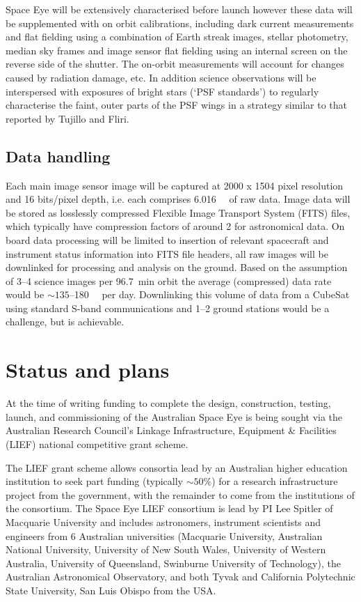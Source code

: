 \documentclass[]{iac}
\begin{document}
Space Eye will be extensively characterised before launch however these data will be supplemented with on orbit
calibrations, including dark current measurements and flat fielding using a combination of Earth streak images, stellar
photometry, median sky frames and image sensor flat fielding using an internal screen on the reverse side of the
shutter. The on-orbit measurements will account for changes caused by radiation damage, etc.
In addition science observations will be interspersed with exposures of bright stars (`PSF standards') to regularly
characterise the faint, outer parts of the PSF wings in a strategy similar to that reported by Tujillo and
Fliri\cite{Trujillo2015}.

\subsection{Data handling}

Each main image sensor image will be captured at 2000 x 1504 pixel resolution and 16 bits/pixel depth, i.e. each
comprises \SI{6.016}{\mega\byte} of raw data. Image data will be stored as losslessly compressed Flexible Image
Transport System (FITS) files, which typically have compression factors of around 2 for astronomical data. On board data
processing will be limited to insertion of relevant spacecraft and instrument status information into FITS file headers,
all raw images will be downlinked for processing and analysis on the ground. Based on the assumption of 3--4 science
images per \SI{96.7}{\minute} orbit the average (compressed) data rate would be $\sim135$--\SI{180}{\mega\byte} per day.
Downlinking this volume of data from a CubeSat using standard S-band communications and 1--2 ground stations would be a
challenge, but is achievable\cite{Reisenfeld2015}.

\section{Status and plans}

At the time of writing funding to complete the design, construction, testing, launch, and commissioning of the
Australian Space Eye is being sought via the Australian Research Council's Linkage Infrastructure, Equipment \&
Facilities (LIEF) national competitive grant scheme.

The LIEF grant scheme allows consortia lead by an Australian higher education institution to seek part funding
(typically $\sim50\%$) for a research infrastructure project from the government, with the remainder to come from the
institutions of the consortium. The Space Eye LIEF consortium is lead by PI Lee Spitler of Macquarie University and
includes astronomers, instrument scientists and engineers from 6 Australian universities (Macquarie University,
Australian National University, University of New South Wales, University of Western Australia,
University of Queensland, Swinburne University of Technology), the Australian Astronomical Observatory, and both Tyvak
and California Polytechnic State University, San Luis Obispo from the USA.
\end{document}
